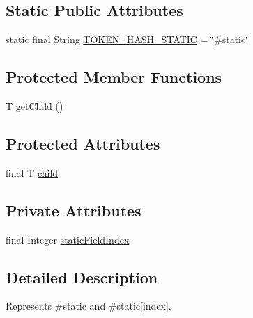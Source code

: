 \subsection*{Static Public Attributes}
\begin{DoxyCompactItemize}
\item 
static final String \hyperlink{classgov_1_1nasa_1_1jpf_1_1inspector_1_1server_1_1expression_1_1expressions_1_1_expression_state_value_static_a1add80ae8df94cded1718bf8e7394a7d}{T\+O\+K\+E\+N\+\_\+\+H\+A\+S\+H\+\_\+\+S\+T\+A\+T\+IC} = \char`\"{}\#static\char`\"{}
\end{DoxyCompactItemize}
\subsection*{Protected Member Functions}
\begin{DoxyCompactItemize}
\item 
T \hyperlink{classgov_1_1nasa_1_1jpf_1_1inspector_1_1server_1_1expression_1_1_expression_state_unary_operator_a150bac338d6557f79ca185d3f6ad6e06}{get\+Child} ()
\end{DoxyCompactItemize}
\subsection*{Protected Attributes}
\begin{DoxyCompactItemize}
\item 
final T \hyperlink{classgov_1_1nasa_1_1jpf_1_1inspector_1_1server_1_1expression_1_1_expression_state_unary_operator_a66041b1f569a361549e28a00f7ca5f2f}{child}
\end{DoxyCompactItemize}
\subsection*{Private Attributes}
\begin{DoxyCompactItemize}
\item 
final Integer \hyperlink{classgov_1_1nasa_1_1jpf_1_1inspector_1_1server_1_1expression_1_1expressions_1_1_expression_state_value_static_a0503b428cc99f4f62e2abcc84635dc23}{static\+Field\+Index}
\end{DoxyCompactItemize}


\subsection{Detailed Description}
Represents \#static and \#static\mbox{[}index\mbox{]}. 

